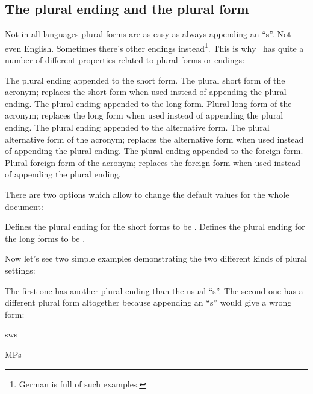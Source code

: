 \documentclass{acro-manual}
\begin{document}
\subsection{The plural ending and the plural form}\label{sec:plural-ending-form}
Not in all languages plural forms are as easy as always appending an
\enquote{s}.  Not even English.  Sometimes there's other endings
instead\footnote{German is full of such examples.}.  This is why \acro\ has
quite a number of different properties related to plural forms or endings:
\begin{properties}
    The plural ending appended to the short form.
  \Initial
    The plural short form of the acronym; replaces the short form when used
    instead of appending the plural ending.
    The plural ending appended to the long form.
  \Initial
    Plural long form of the acronym; replaces the long form when used
    instead of appending the plural ending.
    The plural ending appended to the alternative form.
  \Initial
    The plural alternative form of the acronym; replaces the alternative form
    when used instead of appending the plural ending.
    The plural ending appended to the foreign form.
  \Initial
    Plural foreign form of the acronym; replaces the foreign form when used
    instead of appending the plural ending.  
\end{properties}
There are two options which allow to change the default values for the whole
document:
\begin{options}
    Defines the plural ending for the short forms to be .
    Defines the plural ending for the long forms to be .
\end{options}
Now let's see two simple examples demonstrating the two different kinds of plural
settings:
\begin{sourcecode}
\end{sourcecode}
The first one has another plural ending than the usual \enquote{s}. The second
one has a different plural form altogether because appending an \enquote{s}
would give a wrong form:
\begin{example}
  \acfp{sw} \par
  \acfp{MP}
\end{example}
\end{document}
